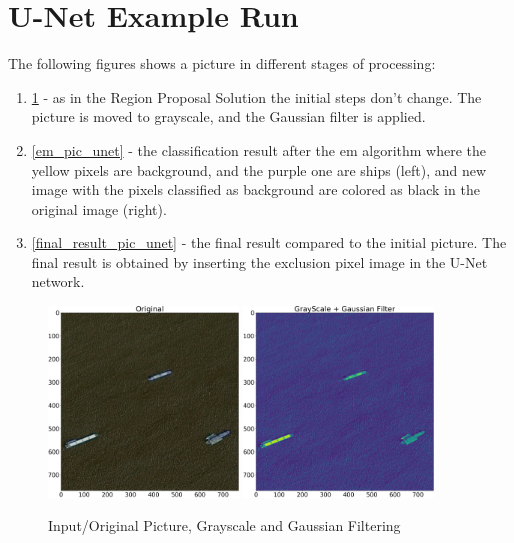 \section{U-Net Example Run}
The following figures shows a picture in different stages of processing:
\begin{enumerate}
	\item \ref{orig_pic_unet} - as in the Region Proposal Solution the initial steps don't change. The picture is moved to grayscale, and the Gaussian filter is applied.
	\item \ref{em_pic_unet} - the classification result after the em algorithm where the yellow pixels are background, and the purple one are ships (left), and new image with the pixels classified as background are colored as black in the original image (right).
	\item \ref{final_result_pic_unet} - the final result compared to the initial picture. The final result is obtained by inserting the exclusion pixel image in the U-Net network.
\end{enumerate}
\begin{figure}[h]
	\centering
	\includegraphics[width=0.45\textwidth]{Pictures/011Original.png}
	\includegraphics[width=0.45\textwidth]{Pictures/011GrayScale.png}
	\caption{Input/Original Picture, Grayscale and Gaussian Filtering}
	\label{orig_pic_unet}
\end{figure}
